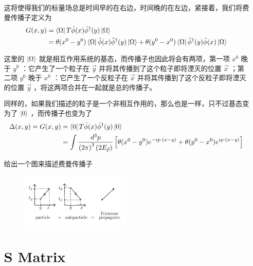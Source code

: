 \documentclass{article}
\begin{document}
这将使得我们的标量场总是时间早的在右边，时间晚的在左边，紧接着，我们将费曼传播子定义为
\begin{align*}
    G(x,y) &= \bra{\Omega}T\hat{\phi}(x)\hat{\phi}^\dagger(y)\ket{\Omega} \\
    &= \theta(x^0 - y^0)\bra{\Omega}\hat{\phi}(x)\hat{\phi}^\dagger(y)\ket{\Omega} + \theta(y^0 - x^0)\bra{\Omega}\hat{\phi}^\dagger(y)\hat{\phi}(x)\ket{\Omega}
\end{align*}

这里的 $\ket{\Omega}$ 就是相互作用系统的基态，而传播子也因此将会有两项，第一项 $x^0$ 晚于 $y^0$ ：它产生了一个粒子在 $\vec{y}$ 并将其传播到了这个粒子即将湮灭的位置 $\vec{x}$ ；第二项 $y^0$ 晚于 $x^0$ ：它产生了一个反粒子在 $\vec{x}$ 并将其传播到了这个反粒子即将湮灭的位置 $\vec{y}$ ，将这两项合并在一起就是总的传播子。

同样的，如果我们描述的粒子是一个非相互作用的，那么也是一样，只不过基态变为了 $\ket{0}$ ，而传播子也变为了
\begin{align*}
    \Delta(x,y) = G(x,y) &= \bra{0}T\hat{\phi}(x)\hat{\phi}^\dagger(y)\ket{0} \\
    &= \int \frac{d^3p}{\left(2\pi\right)^3\left(2E_{\vec{p}}\right)}\left[\theta(x^0 - y^0)e^{-ip\cdot(x - y)} + \theta(y^0 - x^0)e^{ip\cdot\left(x - y\right)}\right]
\end{align*}

给出一个图来描述费曼传播子
\begin{figure}[hbpt]
    \centering
    \includegraphics[width = 0.5\textwidth]{figure/费曼传播子.png}
\end{figure}





\section{S Matrix}
\end{document}
